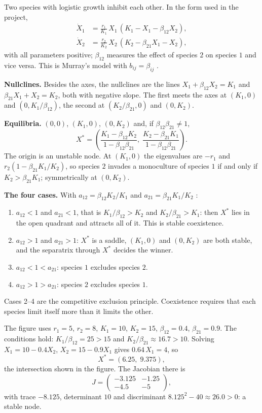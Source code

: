 Two species with logistic growth inhibit
each other. In the form used in the
project,
\begin{equation}
\label{equation-competition}
\begin{aligned}
\dot X_1 &= \frac{r_1}{K_1}\,
X_1\,(K_1 - X_1 - \beta_{12} X_2), \\
\dot X_2 &= \frac{r_2}{K_2}\,
X_2\,(K_2 - \beta_{21} X_1 - X_2),
\end{aligned}
\end{equation}
with all parameters positive;
$\beta_{12}$ measures the effect of species
$2$ on species $1$ and vice versa. This is
Murray's model with $b_{ij}=\beta_{ij}$
\cite[Section 3.5]{murray2002mathematical}.

\textbf{Nullclines.}
Besides the axes, the nullclines are the
lines $X_1 + \beta_{12} X_2 = K_1$ and
$\beta_{21} X_1 + X_2 = K_2$, both with
negative slope. The first meets the axes at
$(K_1,0)$ and $(0,K_1/\beta_{12})$, the
second at $(K_2/\beta_{21},0)$ and
$(0,K_2)$.

\textbf{Equilibria.}
$(0,0)$, $(K_1,0)$, $(0,K_2)$ and, if
$\beta_{12}\beta_{21}\ne 1$,
$$
X^* =
\left(
\frac{K_1-\beta_{12}K_2}
{1-\beta_{12}\beta_{21}},\;
\frac{K_2-\beta_{21}K_1}
{1-\beta_{12}\beta_{21}}
\right).
$$
The origin is an unstable node. At
$(K_1,0)$ the eigenvalues are $-r_1$ and
$r_2(1-\beta_{21}K_1/K_2)$, so species $2$
invades a monoculture of species $1$ if and
only if $K_2 > \beta_{21}K_1$; symmetrically
at $(0,K_2)$.

\textbf{The four cases.}
With $a_{12}=\beta_{12}K_2/K_1$ and
$a_{21}=\beta_{21}K_1/K_2$
\cite[Section 3.5]{murray2002mathematical}:
\begin{enumerate}
\item $a_{12}<1$ and $a_{21}<1$, that is
$K_1/\beta_{12} > K_2$ and
$K_2/\beta_{21} > K_1$: then $X^*$ lies in
the open quadrant and attracts all of it.
This is stable coexistence.
\item $a_{12}>1$ and $a_{21}>1$: $X^*$ is a
saddle, $(K_1,0)$ and $(0,K_2)$ are both
stable, and the separatrix through $X^*$
decides the winner.
\item $a_{12}<1<a_{21}$: species $1$
excludes species $2$.
\item $a_{12}>1>a_{21}$: species $2$
excludes species $1$.
\end{enumerate}
Cases 2--4 are the competitive exclusion
principle. Coexistence requires that each
species limit itself more than it limits
the other.

\begin{example}
\label{example-competition-paper}
The figure uses $r_1=5$, $r_2=8$,
$K_1=10$, $K_2=15$, $\beta_{12}=0.4$,
$\beta_{21}=0.9$. The conditions hold:
$K_1/\beta_{12}=25>15$ and
$K_2/\beta_{21}\approx 16.7>10$. Solving
$X_1 = 10-0.4X_2$, $X_2 = 15-0.9X_1$ gives
$0.64\,X_1 = 4$, so
$$
X^* = (6.25,\; 9.375),
$$
the intersection shown in the figure. The
Jacobian there is
$$
J =
\begin{pmatrix}
-3.125 & -1.25 \\
-4.5 & -5
\end{pmatrix},
$$
with trace $-8.125$, determinant $10$ and
discriminant
$8.125^2-40\approx 26.0>0$: a stable node.
\end{example}

